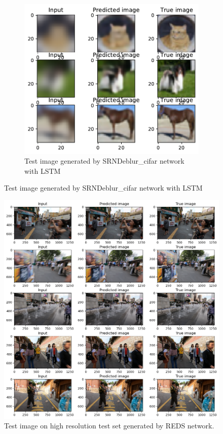 \begin{figure}[H]
\begin{subfigure}{\textwidth}
        \includegraphics[height=0.30\textheight]{subsections/srndeblur/cifarlstmtest.pdf}
        \caption{Test image generated by SRNDeblur\_cifar network with LSTM }
    \end{subfigure} 
\end{figure}

\begin{figure}[H]
    \centering
    \includegraphics[width=\textwidth,keepaspectratio]{subsections/srndeblur/test.png}
    \caption{Test image on high resolution test set generated by REDS network.}
\end{figure}

